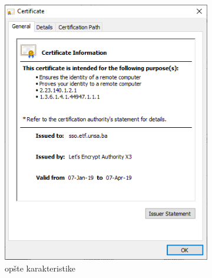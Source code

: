 \begin{figure}[H]
    \centering
    \begin{subfigure}{.5\textwidth}
        \centering
        \includegraphics[width=1\textwidth]{material/etf_cert_gen}
        \caption{opšte karakteristike}
        \label{img:etf_cert_gen}
    \end{subfigure}%
    \begin{subfigure}{.5\textwidth}
        \centering

\end{subfigure}
\end{figure}
